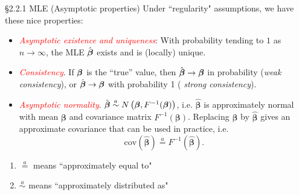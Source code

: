 \documentclass{beamer}
\newcommand{\boldbeta}{{\boldsymbol \beta}}
\newenvironment{wideitemize}%
  {\begin{itemize}%
    \setlength{\parskip}{1em}}%
  {\end{itemize}}
\begin{document}
\begin{frame}{\S2.2.1 MLE (Asymptotic properties)}
Under  ``regularity" assumptions, we have these nice properties:
\begin{wideitemize}
\item
\textit{\textcolor{red}{Asymptotic existence and uniqueness}}: With probability tending to $1$ as $n \rightarrow \infty$,  the MLE $\hat{\mbox{\boldmath $\beta$}}$ exists
and is (locally) unique. 
\item
\textit{\textcolor{red}{Consistency}}. If $\mbox{\boldmath $\beta$}$ is the ``true'' value, then 
$\hat{\mbox{\boldmath $\beta$}}\rightarrow \mbox{\boldmath $\beta$}$ in probability (\textit{weak consistency}),
or $\hat{\mbox{\boldmath $\beta$}}\rightarrow \mbox{\boldmath $\beta$}$ with probability 1 (
\textit{strong consistency}).

\item
\textit{\textcolor{red}{Asymptotic normality}}. $\hat{\mbox{\boldmath $\beta$}}\stackrel{a}{\sim} N
\left(\mbox{\boldmath $\beta$}, F^{-1}(\boldbeta)\right)$, i.e. $\hat{\boldbeta}$ is approximately normal with mean $\boldbeta$ and  covariance matrix $F^{-1} (\boldbeta)$. Replacing $\boldbeta$ by $\hat{\boldbeta}$ gives an approximate covariance that can be used in practice, i.e. 
\[
\text{cov}(\hat{\boldbeta}) \stackrel{a}{=} F^{-1}(\hat{\boldbeta}).
\]


\end{wideitemize}

\begin{enumerate}
\item $\stackrel{a}{=}$  means ``approximately equal to" 
\item $\stackrel{a}{\sim}$ means ``approximately distributed as"
\end{enumerate}
\end{frame}




\end{document}
